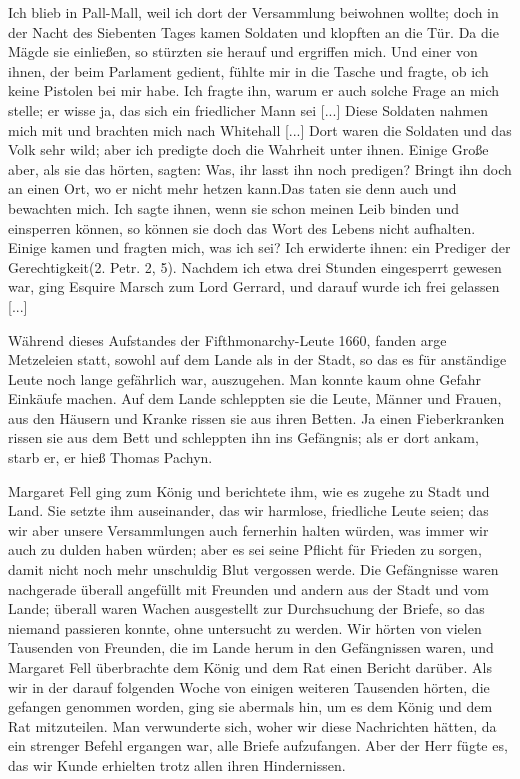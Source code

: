 Ich blieb in Pall-Mall, weil ich dort der Versammlung beiwohnen 
wollte; doch in der Nacht des Siebenten Tages kamen
Soldaten und klopften an die Tür. Da die Mägde sie einließen,
so stürzten sie herauf und ergriffen mich. Und einer von ihnen,
der beim Parlament gedient, fühlte mir in die Tasche und fragte,
ob ich keine Pistolen bei mir habe. Ich fragte ihn, warum er
auch solche Frage an mich stelle; er wisse ja, das sich ein 
friedlicher Mann sei [...] Diese Soldaten nahmen mich mit und
brachten mich nach Whitehall [...] Dort waren die Soldaten
und das Volk sehr wild; aber ich predigte doch die Wahrheit
unter ihnen. Einige Große aber, als sie das hörten, sagten:
\glqq Was, ihr lasst ihn noch predigen? Bringt ihn doch an einen
Ort, wo er nicht mehr hetzen kann.\grqq Das taten sie denn auch
und bewachten mich. Ich sagte ihnen, wenn sie schon meinen
Leib binden und einsperren können, so können sie doch das Wort
des Lebens nicht aufhalten. Einige kamen und fragten mich,
was ich sei? Ich erwiderte ihnen: \glqq ein Prediger der 
Gerechtigkeit\grqq (2. Petr. 2, 5). Nachdem ich etwa drei 
Stunden eingesperrt gewesen war, ging Esquire Marsch zum Lord 
Gerrard, und darauf wurde ich frei gelassen [...]

Während dieses Aufstandes der Fifthmonarchy-Leute 1660,
fanden arge Metzeleien statt, sowohl auf dem Lande als in der
Stadt, so das es für anständige Leute noch lange gefährlich war,
auszugehen. Man konnte kaum ohne Gefahr Einkäufe machen.
Auf dem Lande schleppten sie die Leute, Männer und Frauen,
aus den Häusern und Kranke rissen sie aus ihren Betten. Ja
einen Fieberkranken rissen sie aus dem Bett und schleppten ihn
ins Gefängnis; als er dort ankam, starb er, er hieß Thomas
Pachyn.

Margaret Fell ging zum König und berichtete ihm, wie es
zugehe zu Stadt und Land. Sie setzte ihm auseinander, das wir
harmlose, friedliche Leute seien; das wir aber unsere Versammlungen 
auch fernerhin halten würden, was immer wir auch zu
dulden haben würden; aber es sei seine Pflicht für Frieden zu
sorgen, damit nicht noch mehr unschuldig Blut vergossen werde.
Die Gefängnisse waren nachgerade überall angefüllt mit
Freunden und andern aus der Stadt und vom Lande; überall
waren Wachen ausgestellt zur Durchsuchung der Briefe, so das
niemand passieren konnte, ohne untersucht zu werden. Wir hörten
von vielen Tausenden von Freunden, die im Lande herum in den
Gefängnissen waren, und Margaret Fell überbrachte dem König
und dem Rat einen Bericht darüber. Als wir in der darauf 
folgenden Woche von einigen weiteren Tausenden hörten, die 
gefangen genommen worden, ging sie abermals hin, um es dem König
und dem Rat mitzuteilen. Man verwunderte sich, woher wir
diese Nachrichten hätten, da ein strenger Befehl ergangen war,
alle Briefe aufzufangen. Aber der Herr fügte es, das wir Kunde
erhielten trotz allen ihren Hindernissen.

